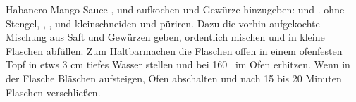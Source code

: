 \begin{recipe}{Habanero Mango Sauce}
,
 und
 aufkochen und Gewürze hinzugeben:
 und
.
 ohne Stengel, 
,
, 
 und
 kleinschneiden und püriren. Dazu die vorhin aufgekochte Mischung aus Saft und Gewürzen geben, ordentlich mischen und in kleine Flaschen abfüllen.
\hint{} Zum Haltbarmachen die Flaschen offen in einem ofenfesten Topf in etws 3 cm tiefes Wasser stellen und bei 160\textcelsius~ im Ofen erhitzen. Wenn in der Flasche Bläschen aufsteigen, Ofen abschalten und nach 15 bis 20 Minuten Flaschen verschließen.
\end{recipe}
